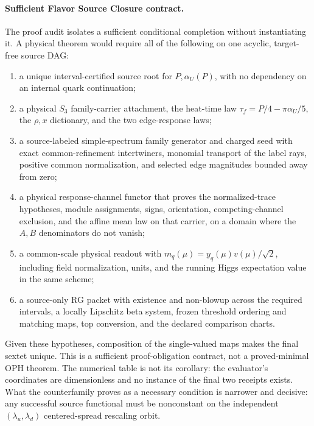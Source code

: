 \documentclass[11pt]{article}
\begin{document}
\paragraph{Sufficient Flavor Source Closure contract.}
The proof audit isolates a sufficient conditional completion without instantiating it.
A physical theorem would require all of the following on one acyclic, target-free source DAG:
\begin{enumerate}[leftmargin=2em]
\item a unique interval-certified source root for \(P,\alpha_U(P)\), with no dependency on an
internal quark continuation;
\item a physical \(S_3\) family-carrier attachment, the heat-time law
\(\tau_f=P/4-\pi\alpha_U/5\), the \(\rho,x\) dictionary, and the two edge-response laws;
\item a source-labeled simple-spectrum family generator and charged seed with exact
common-refinement intertwiners, monomial transport of the label rays, positive common
normalization, and selected edge magnitudes bounded away from zero;
\item a physical response-channel functor that proves the normalized-trace hypotheses, module
assignments, signs, orientation, competing-channel exclusion, and the affine mean law on that
carrier, on a domain where the \(A,B\) denominators do not vanish;
\item a common-scale physical readout with
\(m_q(\mu)=y_q(\mu)v(\mu)/\sqrt2\), including field normalization, units, and the running Higgs
expectation value in the same scheme;
\item a source-only RG packet with existence and non-blowup across the required intervals, a
locally Lipschitz beta system, frozen threshold ordering and matching maps, top conversion, and
the declared comparison charts.
\end{enumerate}
Given these hypotheses, composition of the single-valued maps makes the final sextet unique.
This is a sufficient proof-obligation contract, not a proved-minimal OPH theorem.
The numerical table is not its corollary: the evaluator's coordinates are dimensionless and no
instance of the final two receipts exists. What the
counterfamily proves as a necessary condition is narrower and decisive: any successful source
functional must be nonconstant on the independent
\((\lambda_u,\lambda_d)\) centered-spread rescaling orbit.
\end{document}
